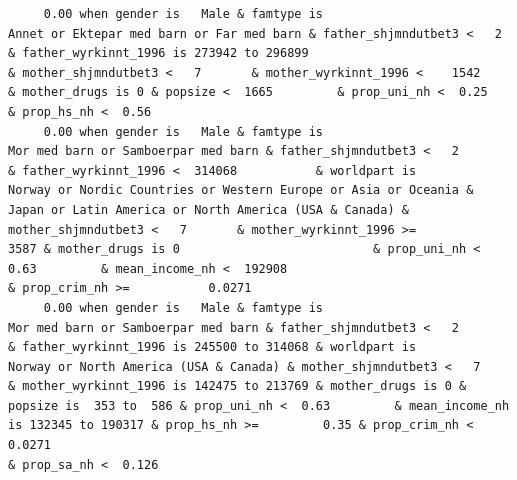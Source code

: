 \documentclass[
  letterpaper,
  DIV=11,
  numbers=noendperiod]{scrreprt}
\begin{document}
\begin{verbatim}
     0.00 when gender is   Male & famtype is                        Annet or Ektepar med barn or Far med barn & father_shjmndutbet3 <   2       & father_wyrkinnt_1996 is 273942 to 296899                                                                                                                                                    & mother_shjmndutbet3 <   7       & mother_wyrkinnt_1996 <    1542           & mother_drugs is 0 & popsize <  1665         & prop_uni_nh <  0.25                                              & prop_hs_nh <  0.56                                                                                                                                                                                                                                                                                                                       
     0.00 when gender is   Male & famtype is                              Mor med barn or Samboerpar med barn & father_shjmndutbet3 <   2       & father_wyrkinnt_1996 <  314068           & worldpart is            Norway or Nordic Countries or Western Europe or Asia or Oceania & Japan or Latin America or North America (USA & Canada) & mother_shjmndutbet3 <   7       & mother_wyrkinnt_1996 >=             3587 & mother_drugs is 0                           & prop_uni_nh <  0.63         & mean_income_nh <  192908                                        & prop_crim_nh >=           0.0271                                                                                                                                                                                                                                                                            
     0.00 when gender is   Male & famtype is                              Mor med barn or Samboerpar med barn & father_shjmndutbet3 <   2       & father_wyrkinnt_1996 is 245500 to 314068 & worldpart is                                                                                              Norway or North America (USA & Canada) & mother_shjmndutbet3 <   7       & mother_wyrkinnt_1996 is 142475 to 213769 & mother_drugs is 0 & popsize is  353 to  586 & prop_uni_nh <  0.63         & mean_income_nh is 132345 to 190317 & prop_hs_nh >=         0.35 & prop_crim_nh <  0.0271                                                                                                                  & prop_sa_nh <  0.126                                                                                                                                               

\end{verbatim}
\end{document}
